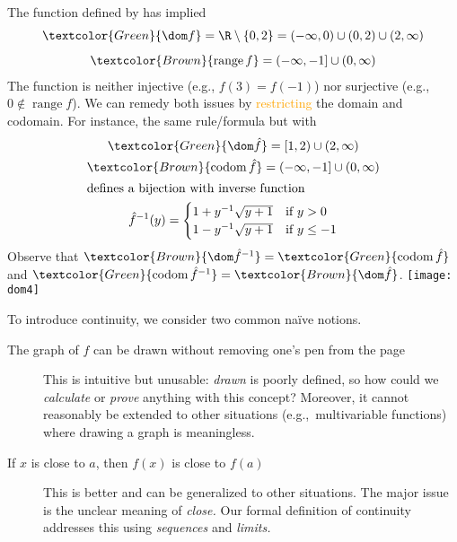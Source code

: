 \begin{example}[lower separated=false, sidebyside, sidebyside align=top seam, sidebyside gap=0pt, righthand width=0.32\linewidth]{}{}
	The function defined by  has implied
	\begin{gather*}
		\textcolor{Green}{\dom f}=\R\setminus\{0,2\}=(-\infty,0)\cup(0,2)\cup (2,\infty)\\[5pt]
		\textcolor{Brown}{\operatorname{range} f}=(-\infty,-1]\cup(0,\infty)
	\end{gather*}
	The function is neither injective (e.g., $f(3)=f(-1)$) nor surjective (e.g., $0\not\in\operatorname{range}f$).\smallbreak
	We can remedy both issues by \textcolor{orange}{restricting} the domain and codomain. For instance, the same rule/formula but with
	\begin{gather*}
		\textcolor{Green}{\dom\hat f}=[1,2)\cup(2,\infty)\\
		\textcolor{Brown}{\operatorname{codom}\hat f}=(-\infty,-1]\cup(0,\infty)\\
		\intertext{defines a bijection with inverse function}
		\hat f^{-1}(y)=
		\begin{cases}
			1+y^{-1}\sqrt{y+1}&\text{if }y>0\\
			1-y^{-1}\sqrt{y+1}&\text{if }y\le -1
		\end{cases}
	\end{gather*}
	Observe that $\textcolor{Brown}{\dom\hat f^{-1}}=\textcolor{Green}{\operatorname{codom}\hat f}$ and $\textcolor{Green}{\operatorname{codom}\hat f^{-1}}=\textcolor{Brown}{\dom\hat f}$.
	\tcblower
	\flushright\texttt{[image: dom4]}
\end{example}

\goodbreak


To introduce continuity, we consider two common naïve notions.
\begin{description}
  \item[The graph of $f$ can be drawn without removing one's pen from the page] This is intuitive but unusable: \emph{drawn} is poorly defined, so how could we \emph{calculate} or \emph{prove} anything with this concept? Moreover, it cannot reasonably be extended to other situations (e.g.,\ multivariable functions) where drawing a graph is meaningless.
  \item[If $x$ is close to $a$, then $f(x)$ is close to $f(a)$] This is better and can be generalized to other situations. The major issue is the unclear meaning of \emph{close.} Our formal definition of continuity addresses this using \emph{sequences} and \emph{limits.}
\end{description}


